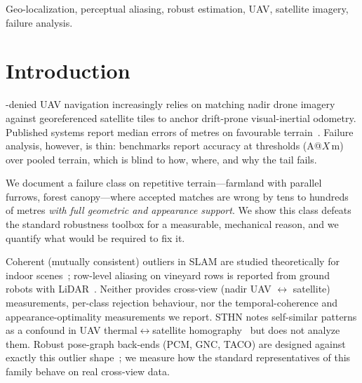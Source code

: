 \documentclass[journal]{IEEEtran}
\begin{document}
\begin{IEEEkeywords}
Geo-localization, perceptual aliasing, robust estimation, UAV, satellite imagery, failure analysis.
\end{IEEEkeywords}

\IEEEpeerreviewmaketitle

\section{Introduction}
-denied UAV navigation increasingly relies on matching nadir drone imagery against georeferenced satellite tiles to anchor drift-prone visual-inertial odometry. Published systems report median errors of metres on favourable terrain~\cite{anyvisloc,orthotrack,ortholoc}. Failure analysis, however, is thin: benchmarks report accuracy at thresholds (A@$X$\,m) over pooled terrain, which is blind to how, where, and why the tail fails.

We document a failure class on repetitive terrain---farmland with parallel furrows, forest canopy---where accepted matches are wrong by tens to hundreds of metres \emph{with full geometric and appearance support}. We show this class defeats the standard robustness toolbox for a measurable, mechanical reason, and we quantify what would be required to fix it.

Coherent (mutually consistent) outliers in SLAM are studied theoretically for indoor scenes~\cite{lajoie2019}; row-level aliasing on vineyard rows is reported from ground robots with LiDAR~\cite{desilva2026,desilva2025,tempovine}. Neither provides cross-view (nadir UAV $\leftrightarrow$ satellite) measurements, per-class rejection behaviour, nor the temporal-coherence and appearance-optimality measurements we report. STHN notes self-similar patterns as a confound in UAV thermal$\leftrightarrow$satellite homography~\cite{sthn} but does not analyze them. Robust pose-graph back-ends (PCM, GNC, TACO) are designed against exactly this outlier shape~\cite{mangelson2018,kimera,yang2020,taco}; we measure how the standard representatives of this family behave on real cross-view data.
\end{document}
